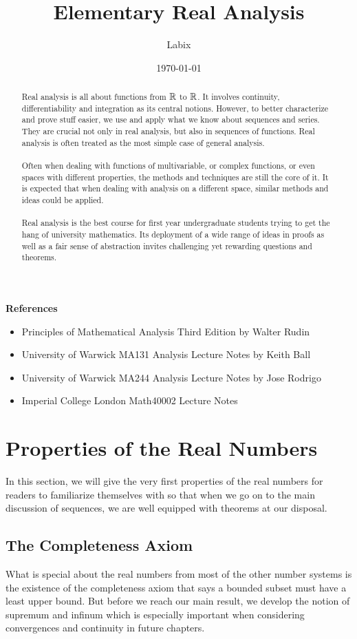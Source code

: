 \documentclass[a4paper]{article}
\title{Elementary Real Analysis}
\author{Labix}
\date{\today}
\begin{document}
\maketitle
\begin{abstract}
Real analysis is all about functions from $\mathbb{R}$ to $\mathbb{R}$. It involves continuity, differentiability and integration as its central notions. However, to better characterize and prove stuff easier, we use and apply what we know about sequences and series. They are crucial not only in real analysis, but also in sequences of functions. Real analysis is often treated as the most simple case of general analysis. \\~\\
Often when dealing with functions of multivariable, or complex functions, or even spaces with different properties, the methods and techniques are still the core of it. It is expected that when dealing with analysis on a different space, similar methods and ideas could be applied. \\~\\
Real analysis is the best course for first year undergraduate students trying to get the hang of university mathematics. Its deployment of a wide range of ideas in proofs as well as a fair sense of abstraction invites challenging yet rewarding questions and theorems. 
\end{abstract}
\textbf{References}
\begin{itemize}
\item Principles of Mathematical Analysis Third Edition by Walter Rudin
\item University of Warwick MA131 Analysis Lecture Notes by Keith Ball
\item University of Warwick MA244 Analysis Lecture Notes by Jose Rodrigo
\item Imperial College London Math40002 Lecture Notes
\end{itemize}
\pagebreak
\tableofcontents
\pagebreak
\section{Properties of the Real Numbers}
In this section, we will give the very first properties of the real numbers for readers to familiarize themselves with so that when we go on to the main discussion of sequences, we are well equipped with theorems at our disposal. 

\subsection{The Completeness Axiom}
What is special about the real numbers from most of the other number systems is the existence of the completeness axiom that says a bounded subset must have a least upper bound. But before we reach our main result, we develop the notion of supremum and infinum which is especially important when considering convergences and continuity in future chapters. \\
\end{document}
